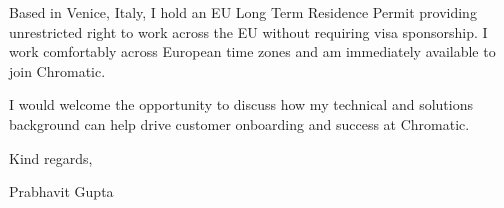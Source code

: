 \documentclass[11pt,a4paper]{article}
\begin{document}
\noindent Based in Venice, Italy, I hold an EU Long Term Residence Permit providing unrestricted right to work across the EU without requiring visa sponsorship. I work comfortably across European time zones and am immediately available to join Chromatic.

\noindent I would welcome the opportunity to discuss how my technical and solutions background can help drive customer onboarding and success at Chromatic.

\vspace{8pt}

\noindent Kind regards,

\vspace{8pt}

\noindent Prabhavit Gupta
\end{document}
